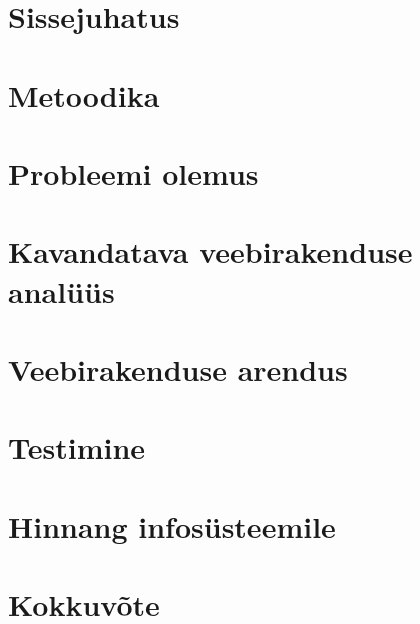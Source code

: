 \chapter{Sissejuhatus}\label{chapter:introduction}


\chapter{Metoodika}\label{chapter:metodology}


\chapter{Probleemi olemus}\label{chapter:problem_statement}


\chapter{Kavandatava veebirakenduse analüüs}\label{chapter:analysis}


\chapter{Veebirakenduse arendus}\label{chapter:development}


\chapter{Testimine}\label{chapter:testing} 


\chapter{Hinnang infosüsteemile}\label{chapter:feedback} 



\chapter{Kokkuvõte}\label{chapter:summary} 


